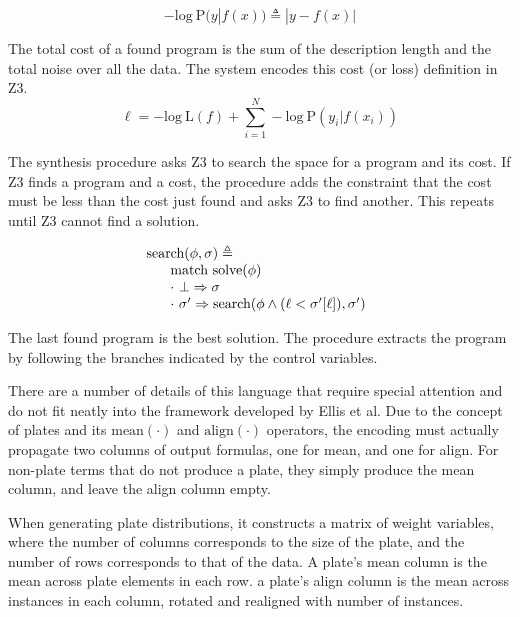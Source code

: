 \documentclass[letterpaper]{llncs}
\begin{document}
\[
    - \text{log}\ \text{P}(y|f(x)) \triangleq |y - f(x)| 
\]

The total cost of a found program is the sum of the description length and the total noise over all the data. 
The system encodes this cost (or loss) definition in Z3.
\[
    \ell = - \text{log}\ \text{L}(f) + \sum_{i=1}^N - \text{log}\ \text{P}(y_i|f(x_i))
\]

The synthesis procedure asks Z3 to search the space for a program
and its cost. If Z3 finds a program and a cost, the procedure 
adds the constraint that the cost must be less than the cost just found
and asks Z3 to find another. This repeats until Z3 cannot find a solution.

\[
\begin{array}{l}
  \text{search}(\phi, \sigma) \triangleq \\
    \hspace{6mm}\begin{array}{@{} l}
    \text{match}\ \text{solve}(\phi) \\
    \cdot\ \bot \Rightarrow \sigma \\
    \cdot\ \sigma' \Rightarrow \text{search}(\phi \wedge (\ell < \sigma'[\ell]), \sigma')
    \end{array}
\end{array}
\]

The last found program is the best solution. The procedure 
extracts the program by following the branches indicated by the 
control variables. 

There are a number of details of this language that require 
special attention and do not fit neatly into the framework  
developed by Ellis et al.
Due to the concept of plates and its 
$\text{mean}(\cdot)$ and $\text{align}(\cdot)$ operators,
the encoding must actually propagate two columns of output formulas,
one for mean, and one for align. 
For non-plate terms that do not produce a plate, they simply
produce the mean column, and leave the align column empty.  

When generating plate distributions, it constructs a matrix of weight variables,
where the number of columns corresponds to the size of the plate, and the number of rows corresponds
to that of the data.
A plate's mean column is the mean across plate elements in each row. 
a plate's align column is the mean across instances in each column, rotated and realigned with number of instances. 
\end{document}
